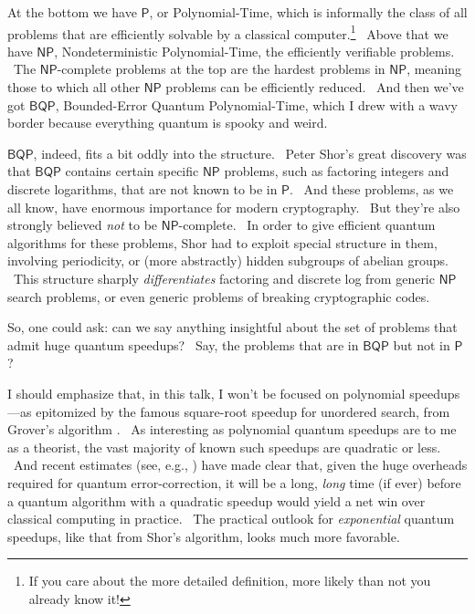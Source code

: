 \documentclass[12pt]{article}
\begin{document}
At the bottom we have $\mathsf{P}$, or Polynomial-Time, which is informally the class of all problems that are efficiently solvable by a classical computer.\footnote{If you care about the more detailed definition, more likely than not you already know it!} \ Above that we have $\mathsf{NP}$, Nondeterministic Polynomial-Time, the efficiently verifiable problems. \ The $\mathsf{NP}$-complete problems at the top are the hardest problems in $\mathsf{NP}$, meaning those to which all other $\mathsf{NP}$ problems can be efficiently reduced. \ And then we've got $\mathsf{BQP}$, Bounded-Error Quantum Polynomial-Time, which I drew with a wavy border because everything quantum is spooky and weird.

$\mathsf{BQP}$, indeed, fits a bit oddly into the structure. \ Peter Shor's great discovery \cite{shor} was that $\mathsf{BQP}$ contains certain specific $\mathsf{NP}$ problems, such as factoring integers and discrete logarithms, that are not known to be in $\mathsf{P}$. \ And these problems, as we all know, have enormous importance for modern cryptography. \ But they're also strongly believed \emph{not} to be $\mathsf{NP}$-complete. \ In order to give efficient quantum algorithms for these problems, Shor had to exploit special structure in them, involving periodicity, or (more abstractly) hidden subgroups of abelian groups. \ This structure sharply \emph{differentiates} factoring and discrete log from generic $\mathsf{NP}$ search problems, or even generic problems of breaking cryptographic codes.

So, one could ask: can we say anything insightful about the set of problems that admit huge quantum speedups? \ Say, the problems that are in $\mathsf{BQP}$ but not in $\mathsf{P}$?

I should emphasize that, in this talk, I won't be focused on polynomial speedups---as epitomized by the famous square-root speedup for unordered search, from Grover's algorithm \cite{grover}. \ As interesting as polynomial quantum speedups are to me as a theorist, the vast majority of known such speedups are quadratic or less. \ And recent estimates (see, e.g., \cite{babbush:beyondquadratic}) have made clear that, given the huge overheads required for quantum error-correction, it will be a long, \emph{long} time (if ever) before a quantum algorithm with a quadratic speedup would yield a net win over classical computing in practice. \ The practical outlook for \emph{exponential} quantum speedups, like that from Shor's algorithm, looks much more favorable.
\end{document}
